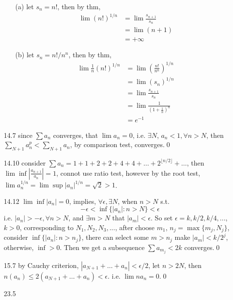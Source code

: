 \documentclass[paper=a4, fontsize=11pt]{scrartcl} %
\numberwithin{equation}{section} %
\numberwithin{figure}{section} %
\numberwithin{table}{section} %
\begin{document}
\begin{itemize}
\begin{itemize}
	\item[(a)] let $s_n = n!$, then by thm,
		\begin{equation}\begin{split}
			\lim (n!)^{1/n} &= \lim \frac{s_{n+1}}{s_n} \\
			&= \lim (n+1) \\ 
			&= +\infty
		\end{split}\end{equation}
	\item[(b)] let $s_n = n!/n^n$, then by thm,
		\begin{equation}\begin{split}
			\lim \frac{1}{n}(n!)^{1/n} &=  \lim (\frac{n!}{n^n})^{1/n}\\
			&= \lim (s_n)^{1/n}\\
			&= \lim \frac{s_{n+1}}{s_n} \\ 
			&= \lim \frac{1}{(1+\frac{1}{n})^n} \\
			&= e^{-1}
		\end{split}\end{equation}
	\end{itemize}
\item[14.7] since $\sum a_n$ converges, that $\lim a_n=0$, i.e. $\exists N$, $a_n<1, \forall n>N$, then $\sum_{N+1} a_n^p <\sum_{N+1} a_n$, by comparison test, converges.\qed
\item[14.10] consider $\sum a_n = 1 + 1 + 2 + 2+ 4+ 4+ \dots+ 2^{\lfloor n/2\rfloor}+\dots$, then $\lim\inf|\frac{a_{n+1}}{a_n}| = 1$, connot use ratio test, however by the root test, $\lim a_n^{1/n}=\lim\sup |a_n|^{1/n} = \sqrt{2}>1$.
\item[14.12] $\lim\inf|a_n| = 0$, implies, $\forall \epsilon, \exists N$, when $n>N$ s.t.
\begin{equation}
-\epsilon < \inf\{|a_n|: n>N\} <\epsilon
\end{equation}
i.e. $|a_n|>-\epsilon,\forall n>N$, and $\exists m>N$ that $|a_m|<\epsilon$. So set $\epsilon=k,k/2,k/4,...$, $k>0$, corresponding to $N_1,N_2,N_3,...$, after choose $m_1$, $n_{j} = \max\{m_j, N_j\}$, consider $\inf\{|a_n|: n>n_{j}\}$, there can select some $m>n_{j}$ make $|a_m|<k/2^{j}$, otherwise, $\inf>0$. Then we get a subsequence $\sum a_{m_j} < 2k$ converges.\qed
\item[15.7] by Cauchy criterion, $|a_{N+1}+\dots+ a_n| <\epsilon/2$, let $n>2N$, then $n(a_n)\leq 2 (a_{N+1}+\dots+ a_n) < \epsilon$. i.e. $\lim na_n = 0$.\qed
\item[23.5] \begin{itemize}

\end{itemize}
\end{itemize}
\end{document}
